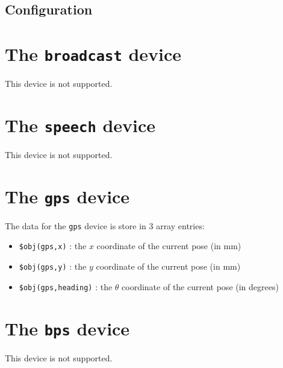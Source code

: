 \documentclass[11pt]{article}
\begin{document}
\subsection{Configuration}

\section{The {\tt broadcast} device}
This device is not supported.

\section{The {\tt speech} device}
This device is not supported.

\section{The {\tt gps} device}
The data for the {\tt gps} device is store in 3 array entries:
\begin{itemize}
\item {\tt \$obj(gps,x)} : the $x$ coordinate of the current pose (in mm)
\item {\tt \$obj(gps,y)} : the $y$ coordinate of the current pose (in mm)
\item {\tt \$obj(gps,heading)} : the $\theta$ coordinate of the current pose 
(in degrees)
\end{itemize}

\section{The {\tt bps} device}
This device is not supported.
\end{document}
